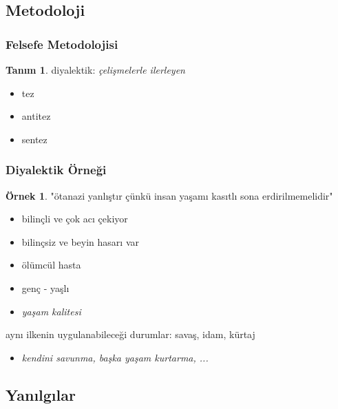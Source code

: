 \documentclass[dvipsnames]{beamer}
\theoremstyle{definition}
\newtheorem{tanim}[theorem]{Tanım}
\theoremstyle{example}
\newtheorem{ornek}[theorem]{Örnek}
\theoremstyle{plain}
\begin{document}
\subsection{Metodoloji}

\begin{frame}
  \frametitle{Felsefe Metodolojisi}

  \begin{tanim}
    \alert{diyalektik}: \emph{çelişmelerle ilerleyen}

    \begin{itemize}
      \item tez
      \item antitez
      \item sentez
    \end{itemize}
  \end{tanim}
\end{frame}

\begin{frame}
  \frametitle{Diyalektik Örneği}

  \begin{ornek}
    \alert{"ötanazi yanlıştır çünkü insan yaşamı kasıtlı sona erdirilmemelidir"}

    \pause
    \begin{itemize}
      \item bilinçli ve çok acı çekiyor
      \item bilinçsiz ve beyin hasarı var
      \item ölümcül hasta
      \item genç - yaşlı

      \pause
      \item \emph{yaşam kalitesi}
    \end{itemize}

    \pause
    aynı ilkenin uygulanabileceği durumlar: savaş, idam, kürtaj

    \begin{itemize}
      \item \emph{kendini savunma, başka yaşam kurtarma, ...}
    \end{itemize}
  \end{ornek}
\end{frame}

\subsection{Yanılgılar}
\end{document}
